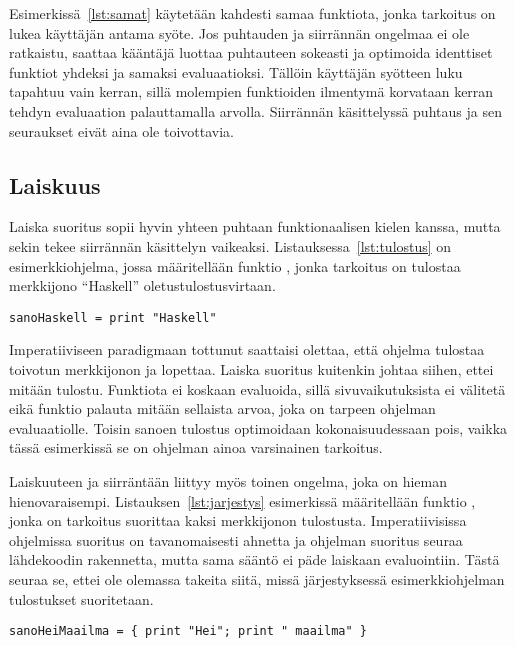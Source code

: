 \documentclass[finnish]{tktltiki2}
\begin{document}
Esimerkissä~\ref{lst:samat} käytetään kahdesti samaa funktiota, jonka tarkoitus on lukea käyttäjän
antama syöte. Jos puhtauden ja siirrännän ongelmaa ei ole ratkaistu, saattaa kääntäjä luottaa
puhtauteen sokeasti ja optimoida identtiset funktiot yhdeksi ja samaksi evaluaatioksi. Tällöin
käyttäjän syötteen luku tapahtuu vain kerran, sillä molempien funktioiden ilmentymä korvataan kerran
tehdyn evaluaation palauttamalla arvolla. Siirrännän käsittelyssä puhtaus ja sen seuraukset eivät
aina ole toivottavia.

\subsection{Laiskuus}

Laiska suoritus sopii hyvin yhteen puhtaan funktionaalisen kielen kanssa, mutta sekin tekee
siirrännän käsittelyn vaikeaksi. Listauksessa~\ref{lst:tulostus} on esimerkkiohjelma, jossa
määritellään funktio , jonka tarkoitus on tulostaa merkkijono ``Haskell''
oletustulostusvirtaan.

\begin{lstlisting}[float,label={lst:tulostus},caption={Tulostava esimerkkiohjelma}]
sanoHaskell = print "Haskell"
\end{lstlisting}

Imperatiiviseen paradigmaan tottunut saattaisi olettaa, että ohjelma tulostaa toivotun merkkijonon
ja lopettaa. Laiska suoritus kuitenkin johtaa siihen, ettei mitään tulostu. Funktiota 
ei koskaan evaluoida, sillä sivuvaikutuksista ei välitetä eikä funktio palauta mitään sellaista
arvoa, joka on tarpeen ohjelman evaluaatiolle. Toisin sanoen tulostus optimoidaan kokonaisuudessaan
pois, vaikka tässä esimerkissä se on ohjelman ainoa varsinainen tarkoitus.

Laiskuuteen ja siirräntään liittyy myös toinen ongelma, joka on hieman hienovaraisempi.
Listauksen~\ref{lst:jarjestys} esimerkissä määritellään funktio , jonka on
tarkoitus suorittaa kaksi merkkijonon tulostusta. Imperatiivisissa ohjelmissa suoritus on
tavanomaisesti ahnetta ja ohjelman suoritus seuraa lähdekoodin rakennetta, mutta sama sääntö ei päde
laiskaan evaluointiin. Tästä seuraa se, ettei ole olemassa takeita siitä, missä järjestyksessä
esimerkkiohjelman tulostukset suoritetaan.

\begin{lstlisting}[float,label={lst:jarjestys},caption={Kahden tulostuksen pseudokoodi}]
sanoHeiMaailma = { print "Hei"; print " maailma" }
\end{lstlisting}
\end{document}
